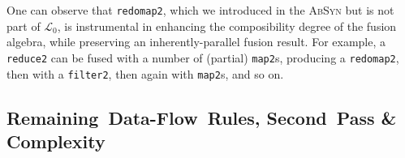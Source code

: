 \documentclass{sigplanconf}  %
\newcommand{\LO}{$\mathcal{L}_0$}
\begin{document}
One can observe that {\tt redomap2}, which we introduced in the \textsc{AbSyn}
but is not part of \LO{}, is instrumental in enhancing the composibility 
degree of the fusion algebra, while preserving an 
inherently-parallel fusion result. For example, a {\tt reduce2}
can be fused with a number of (partial) {\tt map2}s, producing a {\tt redomap2},
then with a {\tt filter2}, then again with {\tt map2}s, and so on. 
  

\subsection{Remaining~Data-Flow~Rules, Second~Pass \& Complexity}
\label{sec:bwdPass}
\end{document}
